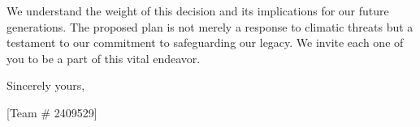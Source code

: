 \documentclass{mcmthesis}
\begin{document}
\begin{letter}{}
    We understand the weight of this decision and its implications for our future generations. The proposed plan is not merely a response to climatic threats but a testament to our commitment to safeguarding our legacy. We invite each one of you to be a part of this vital endeavor.
    
    \vspace{\parskip}
    
    Sincerely yours,
    
    [Team \# 2409529]
    
    \end{letter}

\newpage







\end{document}
